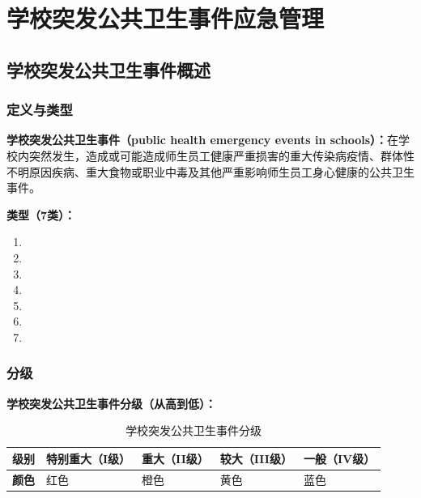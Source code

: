 \chapter{学校突发公共卫生事件应急管理}
\setcounter{chapter}{11}

\section{学校突发公共卫生事件概述}

\subsection{定义与类型}

\begin{defbox}
\textbf{学校突发公共卫生事件（public health emergency events in schools）：}在学校内突然发生，造成或可能造成师生员工健康严重损害的重大传染病疫情、群体性不明原因疾病、重大食物或职业中毒及其他严重影响师生员工身心健康的公共卫生事件。

\textbf{类型（7类）：}

\begin{enumerate}[leftmargin=*]
    \item {}
    \item {}
    \item {}
    \item {}
    \item {}
    \item {}
    \item {}
\end{enumerate}
\end{defbox}

\subsection{分级}

\begin{keybox}
\textbf{学校突发公共卫生事件分级（从高到低）：}

\begin{table}[H]
\centering
\caption{学校突发公共卫生事件分级}
\begin{tabularx}{\textwidth}{l>{\centering\arraybackslash}p{3cm}>{\centering\arraybackslash}p{3cm}>{\centering\arraybackslash}p{3cm}>{\centering\arraybackslash}p{3cm}}
\hline
\textbf{级别} & \textbf{特别重大（I级）} & \textbf{重大（II级）} & \textbf{较大（III级）} & \textbf{一般（IV级）} \\
\hline
\textbf{颜色} & 红色 & 橙色 & 黄色 & 蓝色 \\
\hline
\end{tabularx}
\end{table}
\end{keybox}

